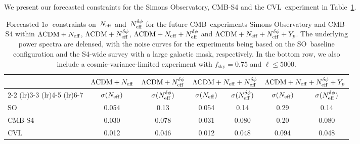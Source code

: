 We present our forecasted constraints for the Simons Observatory, \mbox{CMB-S4} and the CVL~experiment in Table~\ref{ch12-tab:forecasts}.
\begin{table}
	\centering
	\small
	\setlength{\tabcolsep}{3.5pt}
	\begin{tabular}{l c c c c c c}
			\toprule
						& {$\Lambda\mathrm{CDM}+N_\mathrm{eff}$}	& {$\Lambda\mathrm{CDM}+N_\mathrm{eff}^{\delta\phi}$}	& \multicolumn{2}{c}{$\Lambda\mathrm{CDM}+N_\mathrm{eff}+N_\mathrm{eff}^{\delta\phi}$}	& \multicolumn{2}{c}{$\Lambda\mathrm{CDM}+N_\mathrm{eff}+N_\mathrm{eff}^{\delta\phi}+Y_p$}	\\
						  \cmidrule(lr){2-2}			  \cmidrule(lr){3-3}				  \cmidrule(lr){4-5}										  \cmidrule(lr){6-7}
						& {$\sigma(N_\mathrm{eff})$}				& {$\sigma(N_\mathrm{eff}^{\delta\phi})$}				& {$\sigma(N_\mathrm{eff})$}		& {$\sigma(N_\mathrm{eff}^{\delta\phi})$}				& {$\sigma(N_\mathrm{eff})$}		& {$\sigma(N_\mathrm{eff}^{\delta\phi})$}					\\
			\midrule[0.065em]
		SO				& 0.054							& 0.13								& 0.054					& 0.14								& 0.29					& 0.14									\\
		\mbox{CMB-S4}	& 0.030							& 0.078								& 0.031					& 0.080								& 0.20					& 0.080									\\
		CVL				& 0.012							& 0.046								& 0.012					& 0.048								& 0.094					& 0.048									\\
			\bottomrule
	\end{tabular}
	\caption[Forecasted phase shift constraints for future CMB]{Forecasted $1\sigma$~constraints on~$N_\mathrm{eff}$ and~$N_\mathrm{eff}^{\delta\phi}$ for the future CMB~experiments Simons Observatory and \mbox{CMB-S4} within $\Lambda\mathrm{CDM} + N_\mathrm{eff}$, $\Lambda\mathrm{CDM} + N_\mathrm{eff}^{\delta\phi}$, $\Lambda\mathrm{CDM} + N_\mathrm{eff} + N_\mathrm{eff}^{\delta\phi}$ and $\Lambda\mathrm{CDM} + N_\mathrm{eff} + N_\mathrm{eff}^{\delta\phi} + Y_p$. The underlying power spectra are delensed, with the noise curves for the experiments being based on the SO~baseline configuration and the S4-wide survey with a large galactic mask, respectively. In the bottom row, we also include a cosmic-variance-limited experiment with $f_\mathrm{sky} = 0.75$ and $\ell \leq 5000$.}
	\label{ch12-tab:forecasts}
\end{table}
